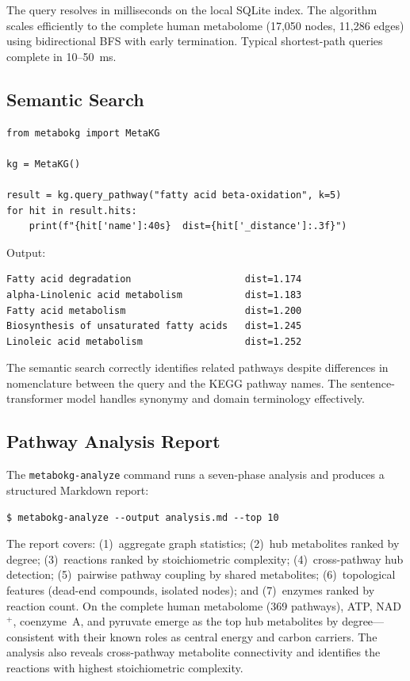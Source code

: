 \documentclass[10pt]{article}
\begin{document}
The query resolves in milliseconds on the local SQLite index. The algorithm
scales efficiently to the complete human metabolome (17,050 nodes, 11,286
edges) using bidirectional BFS with early termination. Typical shortest-path
queries complete in 10--50~ms.

\subsection{Semantic Search}

\begin{lstlisting}[style=python, caption={Semantic pathway retrieval.}]
from metabokg import MetaKG

kg = MetaKG()

result = kg.query_pathway("fatty acid beta-oxidation", k=5)
for hit in result.hits:
    print(f"{hit['name']:40s}  dist={hit['_distance']:.3f}")
\end{lstlisting}

Output:
\begin{lstlisting}[style=bash, caption={}]
Fatty acid degradation                    dist=1.174
alpha-Linolenic acid metabolism           dist=1.183
Fatty acid metabolism                     dist=1.200
Biosynthesis of unsaturated fatty acids   dist=1.245
Linoleic acid metabolism                  dist=1.252
\end{lstlisting}

The semantic search correctly identifies related pathways despite differences
in nomenclature between the query and the KEGG pathway names. The
sentence-transformer model handles synonymy and domain terminology effectively.

\subsection{Pathway Analysis Report}

The \texttt{metabokg-analyze} command runs a seven-phase analysis and produces a
structured Markdown report:

\begin{lstlisting}[style=bash]
$ metabokg-analyze --output analysis.md --top 10
\end{lstlisting}

The report covers: (1)~aggregate graph statistics; (2)~hub metabolites ranked
by degree; (3)~reactions ranked by stoichiometric complexity;
(4)~cross-pathway hub detection; (5)~pairwise pathway coupling by shared
metabolites; (6)~topological features (dead-end compounds, isolated nodes);
and (7)~enzymes ranked by reaction count. On the complete human metabolome
(369 pathways), ATP, NAD$^{+}$, coenzyme~A, and pyruvate emerge as the top
hub metabolites by degree---consistent with their known roles as central
energy and carbon carriers. The analysis also reveals cross-pathway metabolite
connectivity and identifies the reactions with highest stoichiometric
complexity.
\end{document}
